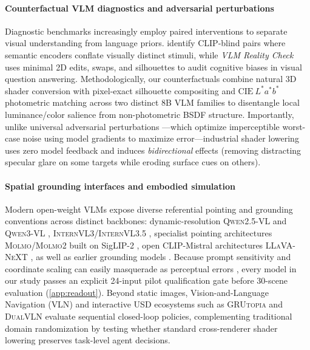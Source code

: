\paragraph{Counterfactual VLM diagnostics and adversarial perturbations}
Diagnostic benchmarks increasingly employ paired interventions to separate visual understanding from language priors. \citet{Tong2024EyesWideShut} identify \textsc{CLIP}-blind pairs where semantic encoders conflate visually distinct stimuli, while \emph{VLM Reality Check} \citep{Sar2026RealityCheck} uses minimal 2D edits, swaps, and silhouettes to audit cognitive biases in visual question answering. Methodologically, our counterfactuals combine natural 3D shader conversion with pixel-exact silhouette compositing and $\mathrm{CIE}~L^*a^*b^*$ photometric matching across two distinct 8B \textsc{VLM} families to disentangle local luminance/color salience from non-photometric \textsc{BSDF} structure. Importantly, unlike universal adversarial perturbations \citep{Chaubey2020UAP}---which optimize imperceptible worst-case noise using model gradients to maximize error---industrial shader lowering uses zero model feedback and induces \emph{bidirectional} effects (removing distracting specular glare on some targets while eroding surface cues on others).

\paragraph{Spatial grounding interfaces and embodied simulation}
Modern open-weight \textsc{VLM}s expose diverse referential pointing and grounding conventions across distinct backbones: dynamic-resolution \textsc{Qwen2.5-VL} and \textsc{Qwen3-VL} \citep{Bai2025Qwen,Bai2025Qwen3}, \textsc{InternVL3}/\textsc{InternVL3.5} \citep{Zhu2025InternVL,Wang2025InternVL35}, specialist pointing architectures \textsc{Molmo}/\textsc{Molmo2} built on SigLIP-2 \citep{Deitke2024Molmo,Clark2026Molmo2}, open \textsc{CLIP}-Mistral architectures \textsc{LLaVA-NeXT} \citep{Liu2024LLaVANeXT}, as well as earlier grounding models \citep{Chen2023Shikra,You2024Ferret,Google2026Gemma4,Agrawal2024Pixtral}. Because prompt sensitivity and coordinate scaling can easily masquerade as perceptual errors \citep{Zhao2021Calibrate}, every model in our study passes an explicit 24-input pilot qualification gate before 30-scene evaluation (\ref{app:readout}). Beyond static images, Vision-and-Language Navigation (\textsc{VLN}) \citep{Anderson2018Vision} and interactive \textsc{USD} ecosystems such as \textsc{GRUtopia} \citep{Wang2024GRUtopia} and \textsc{DualVLN} \citep{Wei2026Ground} evaluate sequential closed-loop policies, complementing traditional domain randomization \citep{Tobin2017Domain,Tremblay2018Training} by testing whether standard cross-renderer shader lowering preserves task-level agent decisions.
